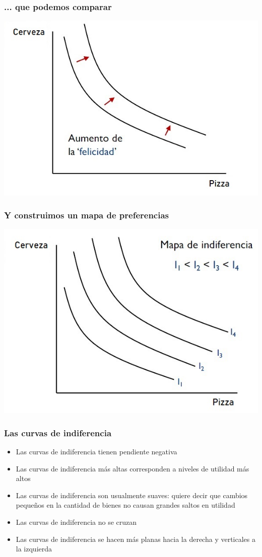 \documentclass{beamer}
\begin{document}
\begin{frame}
\frametitle{ ... que podemos comparar}
\centering
\includegraphics[scale=0.6]{Figures/Tema_02.15_rp13.jpg}
\end{frame}

\begin{frame}
\frametitle{ Y construimos un mapa de preferencias}
\centering
\includegraphics[scale=0.6]{Figures/Tema_02.16_rp14.jpg}
\end{frame}

\begin{frame}
\frametitle{ Las curvas de indiferencia}
\begin{itemize}
    \item Las curvas de indiferencia tienen pendiente negativa
    \item Las curvas de indiferencia más altas corresponden a niveles de utilidad más altos
    \item Las curvas de indiferencia son usualmente suaves: quiere decir que cambios pequeños en la cantidad de bienes no causan grandes saltos en utilidad
    \item Las curvas de indiferencia no se cruzan
    \item Las curvas de indiferencia se hacen más planas hacia la derecha y verticales a la izquierda
\end{itemize} 
\end{frame}
\end{document}
